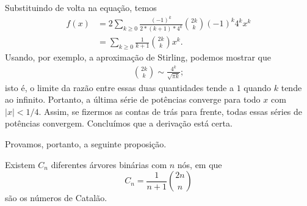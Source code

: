 Substituindo de volta na equação, temos
\begin{align*}
    f(x) &= 2\sum_{k \geq 0}
        \frac{(-1)^k}{2*(k+1) * 4^k} \binom{2k}{k} (-1)^k 4^k x^k \\
        &= \sum_{k \geq 0} \frac 1 {k+1} \binom{2k} k x^k.
\end{align*}
Usando, por exemplo,
a aproximação de Stirling,
podemos mostrar que
\begin{align*}
    \binom{2k} k \sim \frac{4^k}{\sqrt{\pi k}};
\end{align*}
isto é, o limite da razão entre essas duas quantidades tende a $1$
quando $k$ tende ao infinito.
Portanto, a última série de potências converge para todo $x$ com $|x| < 1/4$.
Assim, se fizermos as contas de trás para frente,
todas essas séries de potências convergem.
Concluímos que a derivação está certa.

Provamos, portanto, a seguinte proposição.
\begin{proposition}
    Existem $C_n$ diferentes árvores binárias com $n$ nós,
    em que
    \begin{equation}
        C_n = \frac{1}{n + 1} \binom{2n}{n}
        \label{eq:catalan}
    \end{equation}
    são os números de Catalão.
\end{proposition}
